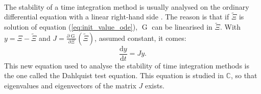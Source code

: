         \paragraph{}
        The stability of a time integration method is usually analysed on the ordinary differential equation with a linear right-hand side \cite{HairerWanner1996}.
        The reason is that if $\tilde{\Xi}$ is solution of equation (\ref{eq:init_value_ode}), $\operatorname{G}$ can be linearised in $\tilde{\Xi}$.
        With $y = \Xi - \tilde{\Xi}$ and $J = \frac{\partial \operatorname{G}}{\partial \Xi}\left(\tilde{\Xi}\right)$, assumed constant, it comes:
        \begin{equation}\label{eq:dahlquist}
          \frac{\mathrm{d} y}{\mathrm{d} t} = J y .
        \end{equation}
        This new equation used to analyse the stability of time integration methods is the one called the Dahlquist test equation.
        This equation is studied in $\mathbb{C}$, so that eigenvalues and eigenvectors of the matrix $J$ exists.

